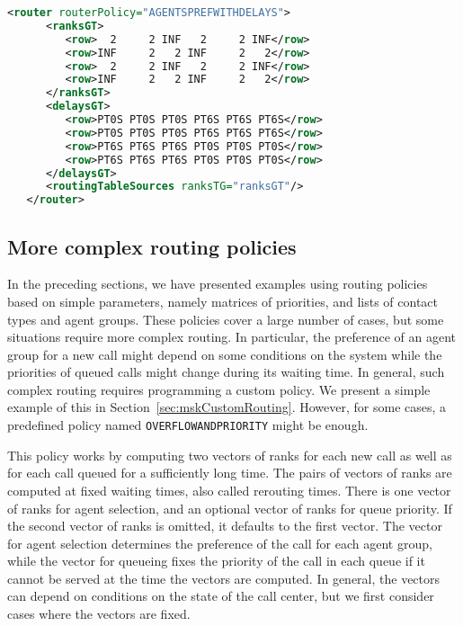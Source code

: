 \begin{lstlisting}[caption={Parameters for the agents'
    preference-based routing policy with delays equivalent to
    local-specialist}, language=XML,
  label=par:mskccParamsThreeTypesRegDelays]
   <router routerPolicy="AGENTSPREFWITHDELAYS">
      <ranksGT>
         <row>  2     2 INF   2     2 INF</row>
         <row>INF     2   2 INF     2   2</row>
         <row>  2     2 INF   2     2 INF</row>
         <row>INF     2   2 INF     2   2</row>
      </ranksGT>
      <delaysGT>
         <row>PT0S PT0S PT0S PT6S PT6S PT6S</row>
         <row>PT0S PT0S PT0S PT6S PT6S PT6S</row>
         <row>PT6S PT6S PT6S PT0S PT0S PT0S</row>
         <row>PT6S PT6S PT6S PT0S PT0S PT0S</row>
      </delaysGT>
      <routingTableSources ranksTG="ranksGT"/>
   </router>
\end{lstlisting}

\subsection{More complex routing policies}
\label{sec:mskComplexRouting}

In the preceding sections, we have presented examples using routing
policies based on simple parameters, namely matrices of priorities,
and lists of contact types and agent groups.
These policies cover a large number of cases, but some situations
require more complex routing.
In particular, the preference of an agent group for a new call
might depend on some conditions on the system while the priorities of
queued calls might change during its waiting time.
In general, such complex
routing requires programming a custom policy. We present a simple
example of this in Section~\ref{sec:mskCustomRouting}.
However, for some cases, a predefined policy named
\texttt{OVERFLOWANDPRIORITY} might be enough.


This policy works by computing two vectors of
ranks for each new call as well as for each
call queued for a sufficiently
long time.
The pairs of vectors of ranks are computed at fixed
waiting times, also called rerouting
times.
There is one
vector of ranks for agent selection, and an
optional vector of ranks for queue priority.
If the second vector of ranks is omitted, it defaults to the first vector.
The vector for agent selection determines the preference of the call for each agent group,
while the vector for queueing
fixes the priority of the call in each queue if it cannot be served at the time the
vectors are computed.
In general, the vectors can depend on conditions on the state of the call
center, but we first consider cases where the vectors are fixed.

